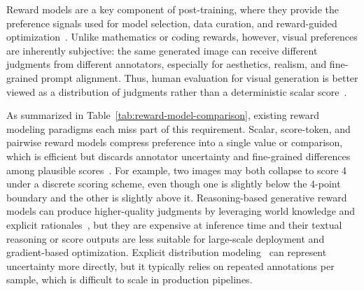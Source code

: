 \documentclass{llmxive}
\providecommand{\mname}{\twemoji[width=0.75em]{zap}-Reward\xspace}
\begin{document}
\begin{table}[!htbp]
\caption{Comparison of reward modeling paradigms for visual generation. Scalar or pairwise reward models are efficient but compress preference uncertainty, while reasoning-based generative reward models improve judgment quality at the cost of inference efficiency and direct differentiability. \mname separates these roles: the teacher uses reasoning to infer score distributions, and the student internalizes this ability for efficient direct scoring and gradient backpropagation.}
\label{tab:reward-model-comparison}
\end{table}


Reward models are a key component of post-training, where they provide the preference signals used for model selection, data curation, and reward-guided optimization~\cite{Ouyang2022TrainingLM, Christiano2017DeepRL, xu2023imagereward, xu2026visionrewardfinegrainedmultidimensionalhuman, wu2025rewarddancerewardscalingvisual}. Unlike mathematics or coding rewards, however, visual preferences are inherently subjective: the same generated image can receive different judgments from different annotators, especially for aesthetics, realism, and fine-grained prompt alignment. Thus, human evaluation for visual generation is better viewed as a distribution of judgments rather than a deterministic scalar score~\cite{murray2012ava,talebi2018nima,wu2023qalign, you2025teachinglargelanguagemodels, ma2025hpsv3widespectrumhumanpreference,uma2021learning,davani2022dealing}.

As summarized in Table~\ref{tab:reward-model-comparison}, existing reward modeling paradigms each miss part of this requirement. Scalar, score-token, and pairwise reward models compress preference into a single value or comparison, which is efficient but discards annotator uncertainty and fine-grained differences among plausible scores~\cite{uma2021learning,davani2022dealing}. For example, two images may both collapse to score 4 under a discrete scoring scheme, even though one is slightly below the 4-point boundary and the other is slightly above it. Reasoning-based generative reward models can produce higher-quality judgments by leveraging world knowledge and explicit rationales~\cite{zheng2023judging,gu2024surveyllmasajudge,chen2024mllmjudge,chen2024mjbench}, but they are expensive at inference time and their textual reasoning or score outputs are less suitable for large-scale deployment and gradient-based optimization. Explicit distribution modeling~\cite{talebi2018nima,diaz2019soft,wen2023ordinal,you2025teachinglargelanguagemodels} can represent uncertainty more directly, but it typically relies on repeated annotations per sample, which is difficult to scale in production pipelines.
\end{document}
